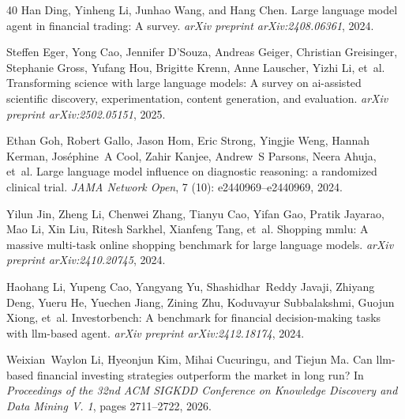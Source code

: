 \begin{thebibliography}{40}
Han Ding, Yinheng Li, Junhao Wang, and Hang Chen.
\newblock Large language model agent in financial trading: A survey.
\newblock \emph{arXiv preprint arXiv:2408.06361}, 2024.

Steffen Eger, Yong Cao, Jennifer D'Souza, Andreas Geiger, Christian Greisinger, Stephanie Gross, Yufang Hou, Brigitte Krenn, Anne Lauscher, Yizhi Li, et~al.
\newblock Transforming science with large language models: A survey on ai-assisted scientific discovery, experimentation, content generation, and evaluation.
\newblock \emph{arXiv preprint arXiv:2502.05151}, 2025.

Ethan Goh, Robert Gallo, Jason Hom, Eric Strong, Yingjie Weng, Hannah Kerman, Jos{\'e}phine~A Cool, Zahir Kanjee, Andrew~S Parsons, Neera Ahuja, et~al.
\newblock Large language model influence on diagnostic reasoning: a randomized clinical trial.
\newblock \emph{JAMA Network Open}, 7 (10): e2440969--e2440969, 2024.

Yilun Jin, Zheng Li, Chenwei Zhang, Tianyu Cao, Yifan Gao, Pratik Jayarao, Mao Li, Xin Liu, Ritesh Sarkhel, Xianfeng Tang, et~al.
\newblock Shopping mmlu: A massive multi-task online shopping benchmark for large language models.
\newblock \emph{arXiv preprint arXiv:2410.20745}, 2024.

Haohang Li, Yupeng Cao, Yangyang Yu, Shashidhar~Reddy Javaji, Zhiyang Deng, Yueru He, Yuechen Jiang, Zining Zhu, Koduvayur Subbalakshmi, Guojun Xiong, et~al.
\newblock Investorbench: A benchmark for financial decision-making tasks with llm-based agent.
\newblock \emph{arXiv preprint arXiv:2412.18174}, 2024.

Weixian~Waylon Li, Hyeonjun Kim, Mihai Cucuringu, and Tiejun Ma.
\newblock Can llm-based financial investing strategies outperform the market in long run?
\newblock In \emph{Proceedings of the 32nd ACM SIGKDD Conference on Knowledge Discovery and Data Mining V. 1}, pages 2711--2722, 2026.


\end{thebibliography}
